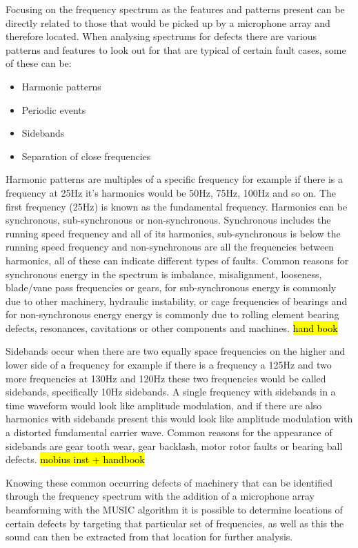 \documentclass{UoNMCHA}
\numberwithin{equation}{section}
\begin{document}
Focusing on the frequency spectrum as the features and patterns present can be directly related to those that would be picked up by a microphone array and therefore located. When analysing spectrums for defects there are various patterns and features to look out for that are typical of certain fault cases, some of these can be:

\begin{itemize}
    \item Harmonic patterns
    \item Periodic events
    \item Sidebands
    \item Separation of close frequencies
\end{itemize}

Harmonic patterns are multiples of a specific frequency for example if there is a frequency at 25Hz it's harmonics would be 50Hz, 75Hz, 100Hz and so on. The first frequency (25Hz) is known as the fundamental frequency.
Harmonics can be synchronous, sub-synchronous or non-synchronous. Synchronous includes the running speed frequency and all of its harmonics, sub-synchronous is below the running speed frequency and non-synchronous are all the frequencies between harmonics, all of these can indicate different types of faults. Common reasons for synchronous energy in the spectrum is imbalance, misalignment, looseness, blade/vane pass frequencies or gears, for sub-synchronous energy is commonly due to other machinery, hydraulic instability, or cage frequencies of bearings and for non-synchronous energy energy is commonly due to rolling element bearing defects, resonances, cavitations or other components and machines. \hl{hand book}

Sidebands occur when there are two equally space frequencies on the higher and lower side of a frequency for example if there is a frequency a 125Hz and two more frequencies at 130Hz and 120Hz these two frequencies would be called sidebands, specifically 10Hz sidebands. A single frequency with sidebands in a time waveform would look like amplitude modulation, and if there are also harmonics with sidebands present this would look like amplitude modulation with a distorted fundamental carrier wave. Common reasons for the appearance of sidebands are gear tooth wear, gear backlash, motor rotor faults or bearing ball defects. \hl{mobius inst + handbook}

Knowing these common occurring defects of machinery that can be identified through the frequency spectrum with the addition of a microphone array beamforming with the MUSIC algorithm it is possible to determine locations of certain defects by targeting that particular set of frequencies, as well as this the sound can then be extracted from that location for further analysis. 
\end{document}
